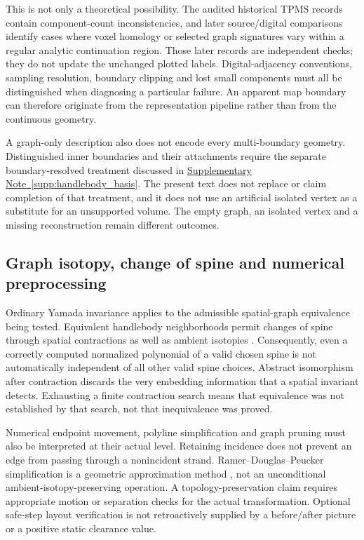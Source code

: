 \documentclass[10pt,twocolumn]{article}
\providecommand{\SuppSubsecref}[1]{\hyperref[#1]{Supplementary Note~\ref*{#1}}}
\begin{document}
This is not only a theoretical possibility. The audited historical TPMS records contain component-count inconsistencies, and later source/digital comparisons identify cases where voxel homology or selected graph signatures vary within a regular analytic continuation region. Those later records are independent checks; they do not update the unchanged plotted labels. Digital-adjacency conventions, sampling resolution, boundary clipping and lost small components must all be distinguished when diagnosing a particular failure. An apparent map boundary can therefore originate from the representation pipeline rather than from the continuous geometry.

A graph-only description also does not encode every multi-boundary geometry. Distinguished inner boundaries and their attachments require the separate boundary-resolved treatment discussed in \SuppSubsecref{supp:handlebody_basis}. The present text does not replace or claim completion of that treatment, and it does not use an artificial isolated vertex as a substitute for an unsupported volume. The empty graph, an isolated vertex and a missing reconstruction remain different outcomes.

\subsection{Graph isotopy, change of spine and numerical preprocessing}
\label{supp:limitations_equivalence}
Ordinary Yamada invariance applies to the admissible spatial-graph equivalence being tested. Equivalent handlebody neighborhoods permit changes of spine through spatial contractions as well as ambient isotopies \cite{kg_ishii2012handlebody}. Consequently, even a correctly computed normalized polynomial of a valid chosen spine is not automatically independent of all other valid spine choices. Abstract isomorphism after contraction discards the very embedding information that a spatial invariant detects. Exhausting a finite contraction search means that equivalence was not established by that search, not that inequivalence was proved.

Numerical endpoint movement, polyline simplification and graph pruning must also be interpreted at their actual level. Retaining incidence does not prevent an edge from passing through a nonincident strand. Ramer--Douglas--Peucker simplification is a geometric approximation method \cite{kg_ramer1972,kg_douglas1973}, not an unconditional ambient-isotopy-preserving operation. A topology-preservation claim requires appropriate motion or separation checks for the actual transformation. Optional safe-step layout verification is not retroactively supplied by a before/after picture or a positive static clearance value.
\end{document}
